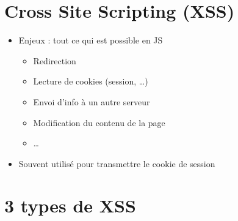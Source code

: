 \hypertarget{cross-site-scripting-xss-1}{%
\section{Cross Site Scripting (XSS)}\label{cross-site-scripting-xss-1}}

\begin{itemize}
\tightlist
\item
  Enjeux : tout ce qui est possible en JS

  \begin{itemize}
  \tightlist
  \item
    Redirection
  \item
    Lecture de cookies (session, \ldots)
  \item
    Envoi d'info à un autre serveur
  \item
    Modification du contenu de la page
  \item
    \ldots{}
  \end{itemize}
\item
  Souvent utilisé pour transmettre le cookie de session
\end{itemize}

\begin{english}

\begin{Shaded}
\begin{Highlighting}[]
\KeywordTok{\textgreater{}}
\end{Highlighting}
\end{Shaded}

\end{english}

\hypertarget{types-de-xss}{%
\section{3 types de XSS}\label{types-de-xss}}

